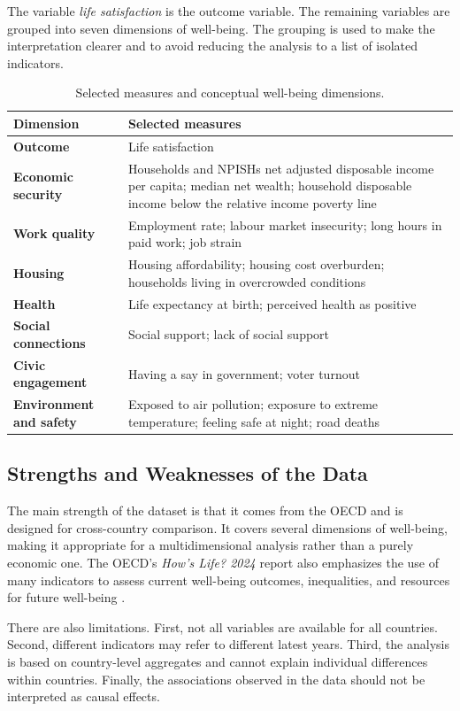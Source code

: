 \documentclass[11pt,a4paper]{article}
\begin{document}
The variable \textit{life satisfaction} is the outcome variable. The remaining variables are grouped into seven dimensions of well-being. The grouping is used to make the interpretation clearer and to avoid reducing the analysis to a list of isolated indicators.

\begin{table}[H]
\centering
\caption{Selected measures and conceptual well-being dimensions.}
\begin{tabularx}{\textwidth}{>{\bfseries}p{} X}
\toprule
Dimension & Selected measures \\
\midrule
Outcome & Life satisfaction \\
Economic security & Households and NPISHs net adjusted disposable income per capita; median net wealth; household disposable income below the relative income poverty line \\
Work quality & Employment rate; labour market insecurity; long hours in paid work; job strain \\
Housing & Housing affordability; housing cost overburden; households living in overcrowded conditions \\
Health & Life expectancy at birth; perceived health as positive \\
Social connections & Social support; lack of social support \\
Civic engagement & Having a say in government; voter turnout \\
Environment and safety & Exposed to air pollution; exposure to extreme temperature; feeling safe at night; road deaths \\
\bottomrule
\end{tabularx}
\end{table}

\subsection{Strengths and Weaknesses of the Data}

The main strength of the dataset is that it comes from the OECD and is designed for cross-country comparison. It covers several dimensions of well-being, making it appropriate for a multidimensional analysis rather than a purely economic one. The OECD's \textit{How's Life? 2024} report also emphasizes the use of many indicators to assess current well-being outcomes, inequalities, and resources for future well-being \cite{oecd_howslife}.

There are also limitations. First, not all variables are available for all countries. Second, different indicators may refer to different latest years. Third, the analysis is based on country-level aggregates and cannot explain individual differences within countries. Finally, the associations observed in the data should not be interpreted as causal effects.
\end{document}
